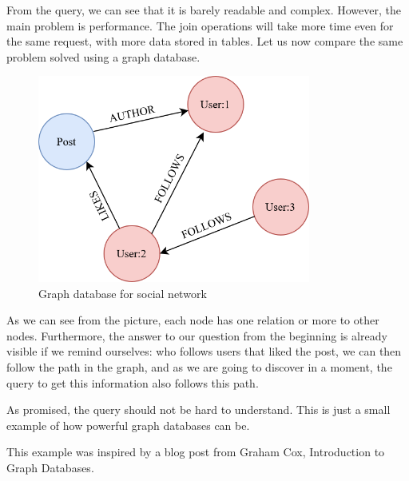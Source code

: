 From the query, we can see that it is barely readable and complex. However, the main problem is performance. The join operations will take more time even for the same request, with more data stored in tables. Let us now compare the same problem solved using a graph database.

\begin{figure}[H]
    \centering
    \includegraphics[width=0.8\textwidth]{content/graph_example.png}
    \caption{Graph database for social network}
\end{figure}

As we can see from the picture, each node has one relation or more to other nodes. Furthermore,
the answer to our question from the beginning is already visible if we remind ourselves:
who follows users that liked the post, we can then follow the path in the graph, and as we are going to discover in a moment,
the query to get this information also follows this path.


As promised, the query should not be hard to understand. This is just a small example of how powerful graph databases can be.

This example was inspired by a blog post from Graham Cox, Introduction to Graph Databases. \cite{cox_introduction_2017}

